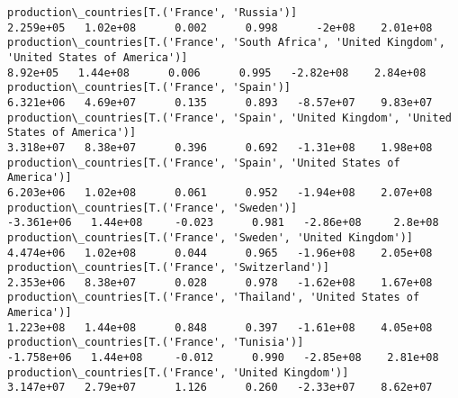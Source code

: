 \documentclass[11pt]{article}
\begin{document}
\begin{Verbatim}[commandchars=\\\{\}]
production\_countries[T.('France', 'Russia')]                                                                                                                                           2.259e+05   1.02e+08      0.002      0.998      -2e+08    2.01e+08
production\_countries[T.('France', 'South Africa', 'United Kingdom', 'United States of America')]                                                                                        8.92e+05   1.44e+08      0.006      0.995   -2.82e+08    2.84e+08
production\_countries[T.('France', 'Spain')]                                                                                                                                            6.321e+06   4.69e+07      0.135      0.893   -8.57e+07    9.83e+07
production\_countries[T.('France', 'Spain', 'United Kingdom', 'United States of America')]                                                                                              3.318e+07   8.38e+07      0.396      0.692   -1.31e+08    1.98e+08
production\_countries[T.('France', 'Spain', 'United States of America')]                                                                                                                6.203e+06   1.02e+08      0.061      0.952   -1.94e+08    2.07e+08
production\_countries[T.('France', 'Sweden')]                                                                                                                                          -3.361e+06   1.44e+08     -0.023      0.981   -2.86e+08     2.8e+08
production\_countries[T.('France', 'Sweden', 'United Kingdom')]                                                                                                                         4.474e+06   1.02e+08      0.044      0.965   -1.96e+08    2.05e+08
production\_countries[T.('France', 'Switzerland')]                                                                                                                                      2.353e+06   8.38e+07      0.028      0.978   -1.62e+08    1.67e+08
production\_countries[T.('France', 'Thailand', 'United States of America')]                                                                                                             1.223e+08   1.44e+08      0.848      0.397   -1.61e+08    4.05e+08
production\_countries[T.('France', 'Tunisia')]                                                                                                                                         -1.758e+06   1.44e+08     -0.012      0.990   -2.85e+08    2.81e+08
production\_countries[T.('France', 'United Kingdom')]                                                                                                                                   3.147e+07   2.79e+07      1.126      0.260   -2.33e+07    8.62e+07

\end{Verbatim}
\end{document}
